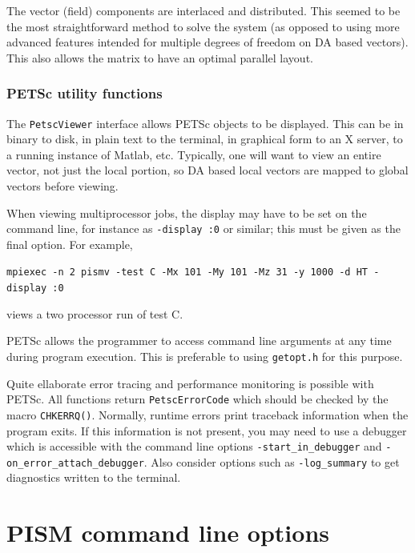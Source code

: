 \documentclass[11pt,final]{amsart}
\renewcommand{\t}[1]{\texttt{#1}}
\begin{document}
The vector (field) components are interlaced and distributed. This seemed to be the
most straightforward method to solve the system (as opposed to using more advanced
features intended for multiple degrees of freedom on DA based vectors). This also allows
the matrix to have an optimal parallel layout.

\subsubsection*{PETSc utility functions}
The \t{PetscViewer} interface allows PETSc objects to be displayed. This can be in binary
to disk, in plain text to the terminal, in graphical form to an X server, to a running
instance of Matlab, etc. Typically, one will want to view an entire vector, not just the
local portion, so DA based local vectors are mapped to global vectors before viewing.

When viewing multiprocessor jobs, the display may have to be set on the command line, for instance as
\t{-display :0} or similar; this must be given as the final option.  For example,

\verb|mpiexec -n 2 pismv -test C -Mx 101 -My 101 -Mz 31 -y 1000 -d HT -display :0|

\noindent views a two processor run of test C.

PETSc allows the programmer to access command line arguments at any time during program
execution. This is preferable to using \t{getopt.h} for this purpose.

Quite ellaborate error tracing and performance monitoring is possible with PETSc.  All
functions return \t{PetscErrorCode} which should be checked by the macro \t{CHKERRQ()}.
Normally, runtime errors print traceback information when the program exits.  If this
information is not present, you may need to use a debugger which is accessible with the
command line options \verb|-start_in_debugger| and \verb|-on_error_attach_debugger|.  Also
consider options such as \verb|-log_summary| to get diagnostics written to the terminal.


\clearpage\newpage



\appendix

\clearpage\newpage
\section{PISM command line options}\label{sect:options}
\end{document}
